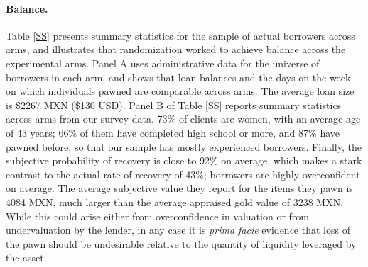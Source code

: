 \documentclass[oneside,11pt]{article}
\begin{document}

    
\paragraph{Balance.} Table \ref{SS} presents summary statistics for the sample of actual borrowers across arms, and illustrates that randomization worked to achieve balance across the experimental arms. Panel A uses administrative data for the universe of borrowers in each arm, and shows that loan balances and the days on the week on which individuals pawned are comparable across arms. The average loan size is \$2267 MXN (\$130 USD). Panel B of Table \ref{SS} reports summary statistics across arms from our survey data. 73\% of clients are women, with an average age of 43 years; 66\% of them have completed high school or more, and 87\% have pawned before, so that our sample has mostly experienced borrowers. Finally, the subjective probability of recovery is close to 92\% on average, which makes a stark contrast to the actual rate of recovery of 43\%; borrowers are highly overconfident on average. The average subjective value they report for the items they pawn is 4084 MXN, much larger than the average appraised gold value of 3238 MXN. While this could arise either from overconfidence in valuation or from undervaluation by the lender, in any case it is \textit{prima facie} evidence that loss of the pawn should be undesirable relative to the quantity of liquidity leveraged by the asset. 






\end{document}
